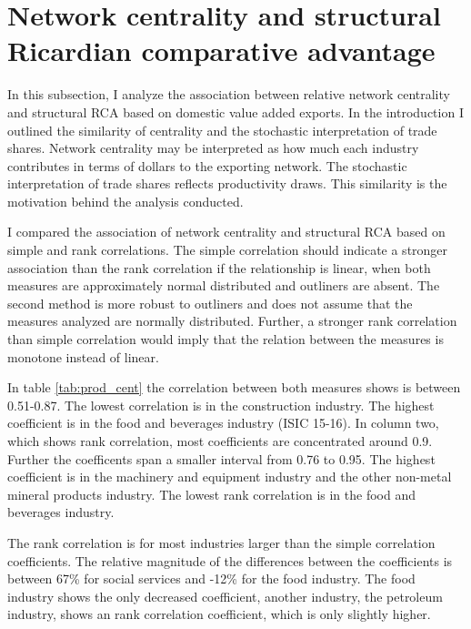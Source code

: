 \section{Network centrality and structural Ricardian comparative advantage}
In this subsection, I analyze the association between relative network centrality and  structural RCA based on domestic value added exports. In the introduction I  outlined the similarity of centrality and the stochastic  interpretation of trade shares. Network centrality may be interpreted as how much each industry contributes in terms of dollars to the exporting network. The stochastic interpretation of trade  shares reflects productivity  draws. This similarity is the motivation behind the analysis conducted.     \par
I compared the association of network centrality and structural RCA based on simple and rank correlations. The simple correlation should indicate a stronger association than the rank correlation if the relationship is linear, when both measures are approximately normal distributed and outliners are absent. The second method is more robust to outliners and does not assume that the measures analyzed are normally distributed. Further, a stronger rank correlation than simple correlation would imply that the relation between the measures is monotone instead of linear. \par
In table \ref{tab:prod_cent} the correlation between both measures shows is between 0.51-0.87. The lowest correlation is in the construction industry. The highest coefficient is in the food and beverages industry (ISIC 15-16). In column two, which shows rank correlation, most coefficients are concentrated around 0.9.  Further the coefficents span a smaller interval from 0.76 to 0.95.  The highest coefficient is in the machinery and equipment industry and the other non-metal mineral products industry. The lowest rank correlation is in the food and beverages industry. \par
The rank correlation is for most industries  larger  than the simple correlation coefficients. The relative magnitude of the differences between the  coefficients is between 67\% for social services and -12\% for the food industry. The food industry shows the only decreased coefficient, another industry, the  petroleum industry, shows an rank correlation coefficient, which is only slightly higher.\par
